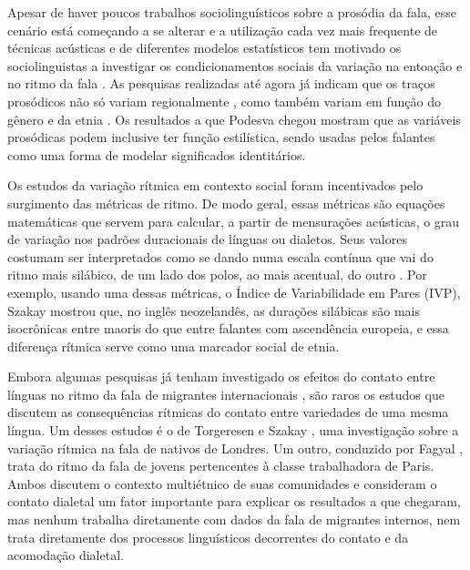 \documentclass[a4paper, 12pt, article, oneside, brazil,leqno]{memoir}
\begin{document}
Apesar de haver poucos trabalhos sociolinguísticos sobre a prosódia da fala,  esse cenário está começando a se alterar e a utilização cada vez mais frequente de técnicas acústicas e de diferentes modelos estatísticos tem motivado os sociolinguistas a investigar os condicionamentos sociais da variação na entoação e no ritmo da fala \cite{thomas2013}.  As pesquisas realizadas até agora já indicam que os traços prosódicos não só variam regionalmente \cite{grabe2000}, como também variam em função do gênero \cite{lowry2011} e da etnia \cite{szakay2006}. Os resultados a que Podesva \cite{podesva2011} chegou mostram que as variáveis prosódicas podem inclusive ter função estilística, sendo usadas pelos falantes como uma forma de modelar significados identitários.

Os estudos da variação rítmica em contexto social foram incentivados pelo surgimento das métricas de ritmo. De modo geral, essas métricas são equações matemáticas que servem para calcular, a partir de mensurações acústicas, o grau de variação nos padrões duracionais de línguas ou dialetos. Seus valores costumam ser interpretados como se dando numa escala contínua que vai do ritmo mais silábico, de um lado dos polos, ao mais acentual, do outro \cite{fuchs2016}.  Por exemplo, usando uma dessas métricas, o Índice de Variabilidade em Pares (IVP), Szakay \citeyear{szakay2006} mostrou que, no inglês neozelandês, as durações silábicas são mais isocrônicas entre maoris do que entre falantes com ascendência europeia, e essa diferença rítmica serve como uma marcador social de etnia.

Embora algumas pesquisas já tenham investigado os efeitos do contato entre línguas no ritmo da fala de migrantes internacionais \cite{carter2005}, são raros os estudos que discutem as consequências rítmicas do contato entre variedades de uma mesma língua. Um desses estudos é o de Torgeresen e Szakay \citeyear{torgersen2012}, uma investigação sobre a variação rítmica na fala de nativos de Londres. Um outro, conduzido por Fagyal \citeyear{fagyal2010}, trata do ritmo da fala de jovens pertencentes à classe trabalhadora de Paris. Ambos discutem o contexto multiétnico de suas comunidades e consideram o contato dialetal um fator importante para explicar os resultados a que chegaram, mas nenhum trabalha diretamente com dados da fala de migrantes internos, nem trata diretamente dos processos linguísticos decorrentes do contato e da acomodação dialetal.
\end{document}
